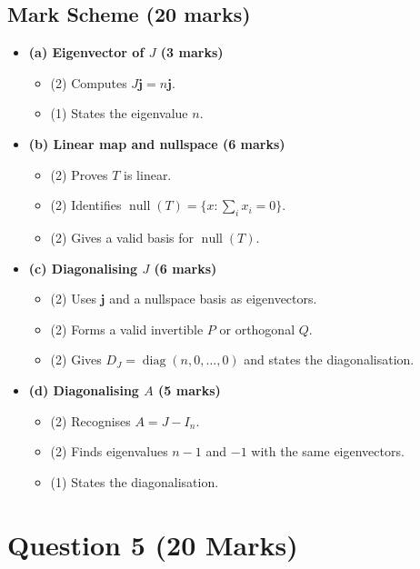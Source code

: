 \documentclass[12pt]{article}
\newcommand{\Null}{\operatorname{null}}
\newcommand{\diag}{\operatorname{diag}}
\begin{document}
\subsection{Mark Scheme (20 marks)}
\begin{itemize}[leftmargin=1.6em]
  \item \textbf{(a) Eigenvector of $J$ (3 marks)}
  \begin{itemize}[leftmargin=1.6em]
    \item (2) Computes $J\mathbf j=n\mathbf j$.
    \item (1) States the eigenvalue $n$.
  \end{itemize}
  \item \textbf{(b) Linear map and nullspace (6 marks)}
  \begin{itemize}[leftmargin=1.6em]
    \item (2) Proves $T$ is linear.
    \item (2) Identifies $\Null(T)=\{x:\sum_i x_i=0\}$.
    \item (2) Gives a valid basis for $\Null(T)$.
  \end{itemize}
  \item \textbf{(c) Diagonalising $J$ (6 marks)}
  \begin{itemize}[leftmargin=1.6em]
    \item (2) Uses $\mathbf j$ and a nullspace basis as eigenvectors.
    \item (2) Forms a valid invertible $P$ or orthogonal $Q$.
    \item (2) Gives $D_J=\diag(n,0,\ldots,0)$ and states the diagonalisation.
  \end{itemize}
  \item \textbf{(d) Diagonalising $A$ (5 marks)}
  \begin{itemize}[leftmargin=1.6em]
    \item (2) Recognises $A=J-I_n$.
    \item (2) Finds eigenvalues $n-1$ and $-1$ with the same eigenvectors.
    \item (1) States the diagonalisation.
  \end{itemize}
\end{itemize}

\newpage
\section{Question 5 \hfill (20 Marks)}
\end{document}
